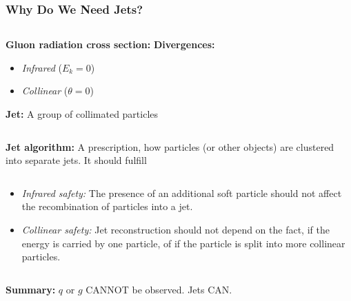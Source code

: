 \documentclass[compress]{beamer}
\begin{document}
\begin{frame}
\frametitle{Why Do We Need Jets?}
\begin{columns}[onlytextwidth]
  \begin{column}{0.5\textwidth}
    \textbf{Gluon radiation cross section:}
    \textbf{Divergences:}
    \begin{itemize}
      \item \textit{\color{red}Infrared} ($E_k = 0$)
      \item \textit{\color{red}Collinear} ($\theta = 0$)
    \end{itemize}
    \textbf{Jet:} A group of collimated particles
  \end{column}
  \begin{column}{0.5\textwidth}
    \begin{equation*}
      \sigma_{q \rightarrow qg} \sim \frac{d\theta}{|\sin\theta|}
      \frac{dE_k}{E_k}
    \end{equation*}
    \begin{figure}[b]
      \centering
      \texttt{[image: \{../PrezentationATLASmeeting/gluonRadiation]}.png}
    \end{figure}
  \end{column}
\end{columns}
\textbf{Jet algorithm:} A prescription, how particles (or other objects) are clustered
  into separate jets. It should fulfill
\begin{columns}[onlytextwidth]
  \begin{column}{0.7\textwidth}
      \begin{itemize}
        \item \textit{Infrared safety:} The presence of an additional soft particle
          should not affect the recombination of particles into a jet.
        \item \textit{Collinear safety:} Jet reconstruction should not depend on the
          fact, if the energy is carried by one particle, of if the particle is
          split into more collinear particles.
      \end{itemize}
  \end{column}
  \begin{column}{0.3\textwidth}
    \begin{figure}[b]
      \centering
      \texttt{[image: \{../PrezentationATLASmeeting/clustering]}.png}
    \end{figure}
  \end{column}
\end{columns}
\textbf{Summary:} $q$ or $g$ {\color{red}CANNOT} be observed. Jets
{\color{red}CAN}.

\end{frame}
\end{document}

